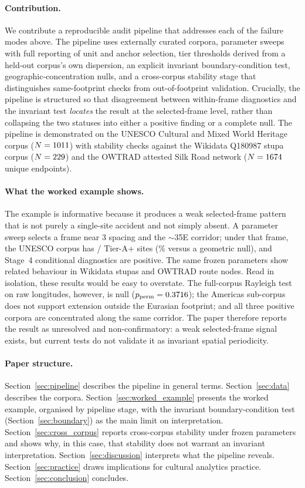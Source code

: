 \documentclass[12pt,a4paper]{article}
\newcommand{\degr}{\ifmmode{^\circ}\else\textdegree{}\fi}
\begin{document}
\paragraph{Contribution.} We contribute a reproducible audit pipeline
that addresses each of the failure modes above. The pipeline
uses externally curated corpora, parameter sweeps with full reporting
of unit and anchor selection, tier thresholds derived from a held-out
corpus's own dispersion, an explicit invariant boundary-condition
test, geographic-concentration nulls, and a cross-corpus stability
stage that distinguishes same-footprint checks from out-of-footprint
validation. Crucially, the pipeline is structured so that disagreement
between within-frame diagnostics and the invariant test \emph{locates}
the result at the selected-frame level, rather than collapsing the two
statuses into either a positive finding or a complete null. The
pipeline is
demonstrated on the UNESCO Cultural and Mixed World Heritage corpus
($N = 1011$) with stability checks against the Wikidata
Q180987 stupa corpus ($N = 229$) and the OWTRAD attested
Silk Road network ($N = 1674$ unique endpoints).

\paragraph{What the worked example shows.} The example is informative
because it produces a weak selected-frame pattern that is not purely a
single-site accident and not simply absent. A parameter sweep selects a
frame near 3\degr{} spacing and the $\sim$35\degr{}E corridor; under
that frame, the UNESCO corpus has \NclusterAp/\NclusterTotal{} Tier-A+
sites (\clusterApRate\% versus a \NullRateAp{} geometric null), and
Stage~4 conditional diagnostics are positive. The same frozen
parameters show related behaviour in Wikidata stupas and OWTRAD route
nodes. Read in isolation, these results would be easy to overstate.
The full-corpus Rayleigh test on raw longitudes, however, is null
($p_{\mathrm{perm}} = 0.3716$); the Americas sub-corpus
does not support extension outside the Eurasian footprint; and all
three positive corpora are concentrated along the same corridor. The
paper therefore reports the result as unresolved and
non-confirmatory: a weak selected-frame signal exists, but current
tests do not validate it as invariant spatial periodicity.

\paragraph{Paper structure.}
Section~\ref{sec:pipeline} describes the pipeline in general terms.
Section~\ref{sec:data} describes the corpora.
Section~\ref{sec:worked_example} presents the worked example, organised
by pipeline stage, with the invariant boundary-condition test
(Section~\ref{sec:boundary}) as the main limit on interpretation.
Section~\ref{sec:cross_corpus} reports cross-corpus stability under
frozen parameters and shows why, in this case, that stability does not
warrant an invariant interpretation.
Section~\ref{sec:discussion} interprets what the pipeline reveals.
Section~\ref{sec:practice} draws implications for cultural analytics
practice. Section~\ref{sec:conclusion} concludes.
\end{document}
